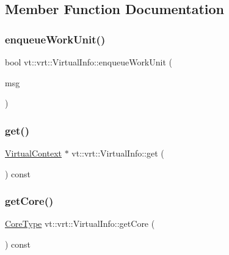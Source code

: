 \subsection{Member Function Documentation}
\mbox{\label{structvt_1_1vrt_1_1_virtual_info_a9e31b6696cfa2482c036f70bf7ae6285}} 
\subsubsection{\texorpdfstring{enqueue\+Work\+Unit()}{enqueueWorkUnit()}}
{\footnotesize\ttfamily bool vt\+::vrt\+::\+Virtual\+Info\+::enqueue\+Work\+Unit (\begin{DoxyParamCaption}\item[{\hyperlink{structvt_1_1vrt_1_1_virtual_message}{Virtual\+Message} $\ast$}]{msg }\end{DoxyParamCaption})}

\mbox{\label{structvt_1_1vrt_1_1_virtual_info_a7857993ff78f907fd2d95d5637cc9a87}} 
\subsubsection{\texorpdfstring{get()}{get()}}
{\footnotesize\ttfamily \hyperlink{structvt_1_1vrt_1_1_virtual_context}{Virtual\+Context} $\ast$ vt\+::vrt\+::\+Virtual\+Info\+::get (\begin{DoxyParamCaption}{ }\end{DoxyParamCaption}) const}

\mbox{\label{structvt_1_1vrt_1_1_virtual_info_aa7975f69ba3af7f8910eb3820cc18369}} 
\subsubsection{\texorpdfstring{get\+Core()}{getCore()}}
{\footnotesize\ttfamily \hyperlink{namespacevt_a74b11b22c02feaabab8591acc87c7c52}{Core\+Type} vt\+::vrt\+::\+Virtual\+Info\+::get\+Core (\begin{DoxyParamCaption}{ }\end{DoxyParamCaption}) const\hspace{0.3cm}{\ttfamily [inline]}}

